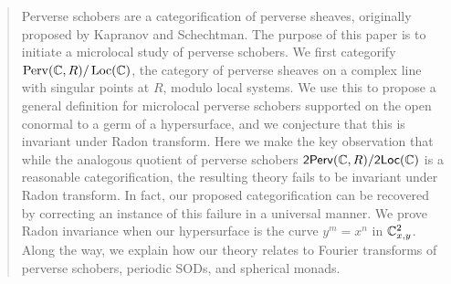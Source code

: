 \begin{abstract}
Perverse schobers are a categorification of perverse sheaves, originally proposed by Kapranov and Schechtman. The purpose of this paper is to initiate a microlocal study of perverse schobers. We first categorify $\Perv(\bbC,R)/\Loc(\bbC)$, the category of perverse sheaves on a complex line with singular points at $R$, modulo local systems. We use this to propose a general definition for microlocal perverse schobers supported on the open conormal to a germ of a hypersurface, and we conjecture that this is invariant under Radon transform. Here we make the key observation that while the analogous quotient of perverse schobers $\mathsf{2Perv}(\bbC,R)/\mathsf{2Loc}(\bbC)$ is a reasonable categorification, the resulting theory fails to be invariant under Radon transform. In fact, our proposed categorification can be recovered by correcting an instance of this failure in a universal manner. We prove Radon invariance when our hypersurface is the curve $y^m=x^n$ in $\bbC^2_{x,y}$. Along the way, we explain how our theory relates to Fourier transforms of perverse schobers, periodic SODs, and spherical monads.
\end{abstract}